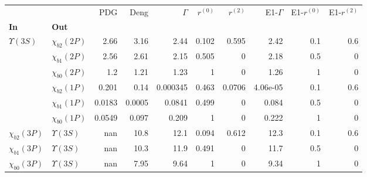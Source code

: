 \begin{tabular}{l|l|r|r|r|r|r|r|r|r}
\toprule
                &                &    PDG &   Deng &  $\Gamma$ &  $r^{(0)}$ &  $r^{(2)}$ &  E1-$\Gamma$ &  E1-$r^{(0)}$ &  E1-$r^{(2)}$ \\
\textbf{In} & \textbf{Out} &        &        &           &            &            &              &               &               \\
\midrule
\textbf{$\Upsilon(3S)$} & \textbf{$\chi_{b2}(2P)$} &   2.66 &   3.16 &      2.44 &      0.102 &      0.595 &         2.42 &           0.1 &           0.6 \\
                & \textbf{$\chi_{b1}(2P)$} &   2.56 &   2.61 &      2.15 &      0.505 &          0 &         2.18 &           0.5 &             0 \\
                & \textbf{$\chi_{b0}(2P)$} &    1.2 &   1.21 &      1.23 &          1 &          0 &         1.26 &             1 &             0 \\
                & \textbf{$\chi_{b2}(1P)$} &  0.201 &   0.14 &  0.000345 &      0.463 &     0.0706 &     4.06e-05 &           0.1 &           0.6 \\
                & \textbf{$\chi_{b1}(1P)$} & 0.0183 & 0.0005 &    0.0841 &      0.499 &          0 &        0.084 &           0.5 &             0 \\
                & \textbf{$\chi_{b0}(1P)$} & 0.0549 &  0.097 &     0.209 &          1 &          0 &        0.222 &             1 &             0 \\
\textbf{$\chi_{b2}(3P)$} & \textbf{$\Upsilon(3S)$} &    nan &   10.8 &      12.1 &      0.094 &      0.612 &         12.3 &           0.1 &           0.6 \\
\textbf{$\chi_{b1}(3P)$} & \textbf{$\Upsilon(3S)$} &    nan &   10.3 &      11.9 &      0.491 &          0 &         11.7 &           0.5 &             0 \\
\textbf{$\chi_{b0}(3P)$} & \textbf{$\Upsilon(3S)$} &    nan &   7.95 &      9.64 &          1 &          0 &         9.34 &             1 &             0 \\
\bottomrule
\end{tabular}
